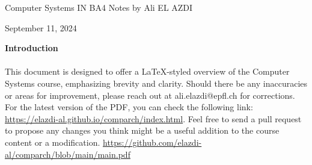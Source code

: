 
\begin{titlepage}
    \centering
    \vspace*{1cm}
    \Huge
    Computer Systems \newline
    \vspace{10px}
    \LARGE IN BA4
    \vspace*{10px}
    \newline
    \Large Notes by Ali EL AZDI

    \vfill
    \large
    September 11, 2024
\end{titlepage}

\begin{center}
    \vspace*{1cm}
    \textbf{Introduction}
    \newline
    \paragraph[short]{}{This document is designed to offer a LaTeX-styled overview of the Computer Systems course, emphasizing brevity and clarity. Should there be any inaccuracies or areas for improvement, please reach out at ali.elazdi@epfl.ch for corrections. For the latest version of the PDF, you can check the following link: 
    \url{https://elazdi-al.github.io/comparch/index.html}. Feel free to send a pull request to propose any changes you think might be a useful addition to the course content or a modification.}
    \newline
   \url{
        https://github.com/elazdi-al/comparch/blob/main/main.pdf
    }
    \newline
\end{center}


\tableofcontents

